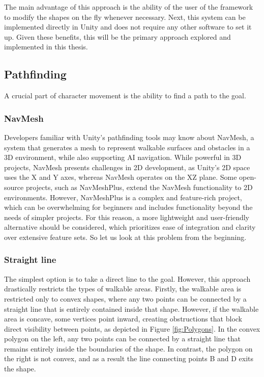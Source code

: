 The main advantage of this approach is the ability of the user of the framework to modify the shapes on the fly whenever necessary. Next, this system can be implemented directly in Unity and does not require any other software to set it up. Given these benefits, this will be the primary approach explored and implemented in this thesis. 


\subsection{Pathfinding}
A crucial part of character movement is the ability to find a path to the goal.

\subsubsection{NavMesh}
Developers familiar with Unity’s pathfinding tools may know about NavMesh, a system that generates a mesh to represent walkable surfaces and obstacles in a 3D environment, while also supporting AI navigation. While powerful in 3D projects, NavMesh presents challenges in 2D development, as Unity's 2D space uses the X and Y axes, whereas NavMesh operates on the XZ plane. Some open-source projects, such as NavMeshPlus, extend the NavMesh functionality to 2D environments. However, NavMeshPlus is a complex and feature-rich project, which can be overwhelming for beginners and includes functionality beyond the needs of simpler projects. For this reason, a more lightweight and user-friendly alternative should be considered, which prioritizes ease of integration and clarity over extensive feature sets. So let us look at this problem from the beginning.

\subsubsection{Straight line}
The simplest option is to take a direct line to the goal. However, this approach drastically restricts the types of walkable areas. Firstly, the walkable area is restricted only to convex shapes, where any two points can be connected by a straight line that is entirely contained inside that shape. However, if the walkable area is concave, some vertices point inward, creating obstructions that block direct visibility between points, as depicted in Figure \ref{fig:Polygons}. In the convex polygon on the left, any two points can be connected by a straight line that remains entirely inside the boundaries of the shape. In contrast, the polygon on the right is not convex, and as a result the line connecting points B and D exits the shape. 

